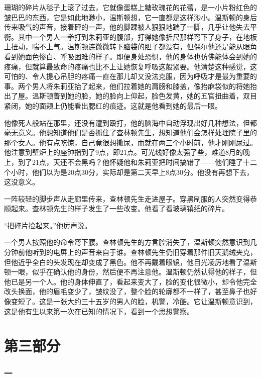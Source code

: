 珊瑚的碎片从毯子上滚了过去，它就像蛋糕上糖玫瑰花的花蕾，是一小片粉红色的皱巴巴的东西，它是如此地渺小，温斯顿想，它一直都是这样渺小。温斯顿的身后传来吸气的声音，接着砰的一声，他的脚踝被人狠狠地踹了一脚，几乎让他失去平衡。其中一个男人一拳打到朱莉亚的腹部，打得她像折尺那样弯下了身子，在地板上扭动，喘不上气。温斯顿连微微转下脑袋的胆子都没有，但偶尔他还是能从眼角看到她面色惨白、呼吸困难的样子。即便身处恐惧，他的身体也仿佛能体会到她的疼痛，但就算最致命的疼痛也比不上让她恢复呼吸这般紧要。他清楚这种感觉，这可怕的、令人提心吊胆的疼痛一直在那儿却又没法克服，因为呼吸才是最为重要的事。两个男人将朱莉亚抬了起来，他们拉着她的肩膀和膝盖，像抬麻袋似的将她抬出了屋。温斯顿瞥到她的脸，她的脸向上仰起，脸色发黄，她的五官扭曲着，双目紧闭，她的面颊上仍能看出腮红的痕迹。这就是他看到她的最后一眼。

他像死人般站在那里，还没有遭到殴打，他的脑海中自动浮现出好几种想法，但都毫无意义。他想知道他们是否抓住了查林顿先生，想知道他们会怎样处理院子里的那个女人。他有点吃惊，自己竟很想撒尿，而就在两三个小时前，他才刚刚尿过。他注意到壁炉上的座钟指到了9点，即21点。可光线好像太强了些，难道8月的晚上，到了21点，天还不会黑吗？他怀疑他和朱莉亚把时间搞错了——他们睡了十二个小时，他们以为是20点30分，实际却是第二天早上8点30分。他没有再想下去，这没意义。

一阵较轻的脚步声从走廊里传来，查林顿先生走进屋子。穿黑制服的人突然变得恭顺起来。查林顿先生的样子发生了一些改变。他看了看玻璃镇纸的碎片。

``把碎片捡起来。''他厉声说。

一个男人按照他的命令弯下腰。查林顿先生的方言腔消失了，温斯顿突然意识到几分钟前他听到的电屏上的声音来自于谁。查林顿先生仍旧穿着那件旧天鹅绒夹克，但他近乎全白的头发现在却变成了黑色。他不再戴着眼镜，他目光凌厉地看了温斯顿一眼，似乎在确认他的身份，然后便不再注意他。温斯顿仍然认得他的样子，但他已是另一个人。他的身体伸直了，看起来变大了，脸的变化很微小，却令他完全改头换面，他的眉毛变少了，皱纹没了，整个脸的轮廓都不一样了，甚至鼻子也好像变短了。这是一张大约三十五岁的男人的脸，机警，冷酷。它让温斯顿意识到，这是他有生以来第一次在已知的情况下，看到一个思想警察。

\part*{第三部分}

\section*{一}\label{ux5341ux4e5d}

